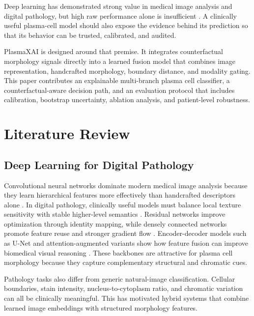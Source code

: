 \documentclass[runningheads]{llncs}
\begin{document}
Deep learning has demonstrated strong value in medical image analysis and digital pathology, but high raw performance alone is insufficient \cite{litjens,bera,campanella}. A clinically useful plasma-cell model should also expose the evidence behind its prediction so that its behavior can be trusted, calibrated, and audited.

PlasmaXAI is designed around that premise. It integrates counterfactual morphology signals directly into a learned fusion model that combines image representation, handcrafted morphology, boundary distance, and modality gating. This paper contributes an explainable multi-branch plasma cell classifier, a counterfactual-aware decision path, and an evaluation protocol that includes calibration, bootstrap uncertainty, ablation analysis, and patient-level robustness.

\section{Literature Review}
\subsection{Deep Learning for Digital Pathology}
Convolutional neural networks dominate modern medical image analysis because they learn hierarchical features more effectively than handcrafted descriptors alone \cite{litjens,janowczyk}. In digital pathology, clinically useful models must balance local texture sensitivity with stable higher-level semantics \cite{bera,campanella}. Residual networks improve optimization through identity mapping, while densely connected networks promote feature reuse and stronger gradient flow \cite{resnet,densenet}. Encoder-decoder models such as U-Net and attention-augmented variants show how feature fusion can improve biomedical visual reasoning \cite{unet,attentionunet}. These backbones are attractive for plasma cell morphology because they capture complementary structural and chromatic cues.

Pathology tasks also differ from generic natural-image classification. Cellular boundaries, stain intensity, nucleus-to-cytoplasm ratio, and chromatic variation can all be clinically meaningful. This has motivated hybrid systems that combine learned image embeddings with structured morphology features.
\end{document}
